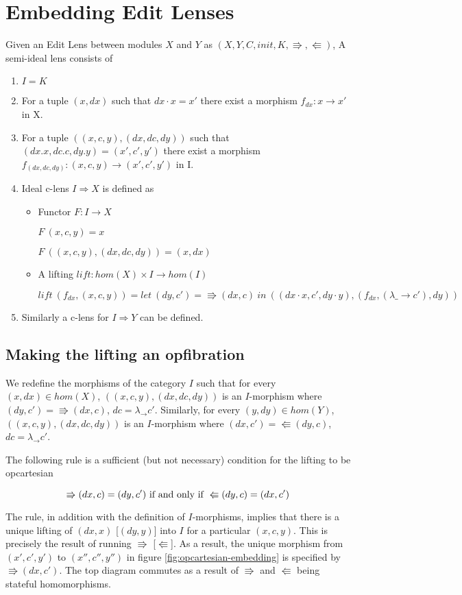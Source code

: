 \documentclass[a4paper,10pt]{article}
\begin{document}
\section{Embedding Edit Lenses}
Given an Edit Lens between modules $X$ and $Y$ as $(X,Y,C,init,K,\Rrightarrow,\Lleftarrow)$, A semi-ideal lens consists of
\begin{enumerate}
\item $I = K$
\item For a tuple $(x,dx)$ such that $dx \cdot x=x'$ there
  exist a morphism $f_{dx}: x \to x'$ in X. 
\item For a tuple $((x,c,y),(dx,dc,dy))$ such
  that $(dx.x,dc.c,dy.y)=(x',c',y')$ there exist a morphism $f_{(dx,dc,dy)}:
  (x,c,y) \to (x',c',y')$ in I.
\item Ideal c-lens $I \Rightarrow X$ is defined as 

\begin {itemize}
\item Functor $F: I \to X$ 

$F~(x,c,y) = x$ 

$F~((x,c,y),(dx,dc,dy))=(x,dx)$ 
\item A lifting $lift: hom(X) \times I \to hom(I)$ 
      
$lift~(f_{dx},(x,c,y))=let~(dy,c')=\Rrightarrow(dx,c)~in~((dx \cdot x, c', dy \cdot y), (f_{dx},(\lambda
  \_ \to c'),dy))$
\end{itemize}
\item Similarly a c-lens for $I \Rightarrow Y$ can be defined.
\end{enumerate}

\subsection{Making the lifting an opfibration}
  We redefine the morphisms of the category $I$ such that for every $(x, dx) \in hom(X)$, $((x,c,y),(dx,dc,dy))$ is an $I$-morphism where $(dy,c') = \Rrightarrow (dx,c)$, $dc = \lambda _ \to c'$.
  Similarly, for every $(y, dy) \in hom(Y)$, $((x,c,y),(dx,dc,dy))$ is an $I$-morphism where $(dx,c') = \Lleftarrow (dy,c)$, $dc = \lambda _ \to c'$. 
  
  The following rule is a sufficient (but not necessary) condition for the lifting to be opcartesian
  
  \[ \Rrightarrow (dx,c) = (dy, c') \textnormal{ if and only if } \Lleftarrow (dy, c) = (dx, c') \]

  The rule, in addition with the definition of $I$-morphisms, implies that there is a unique lifting of $(dx, x)$ [$(dy, y)$] into $I$ for a particular $(x,c,y)$. This is precisely the result of running $\Rrightarrow$ [$\Lleftarrow$]. As a result, the unique morphism from $(x',c',y')$ to $(x'',c'',y'')$ in figure \ref{fig:opcartesian-embedding} is specified by $\Rrightarrow (dx, c')$. The top diagram commutes as a result of $\Rrightarrow$ and $\Lleftarrow$ being stateful homomorphisms.
  
\end{document}
